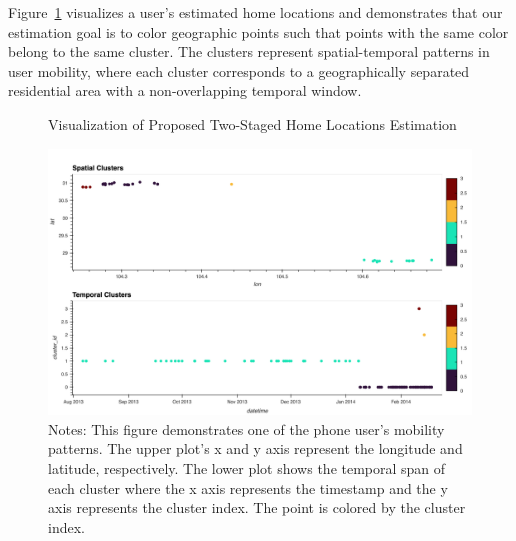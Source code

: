 \clearpage\newpage
Figure~\ref{fig:cluster} visualizes a user's estimated home locations and demonstrates that our estimation goal is to color geographic points such that points with the same color belong to the same cluster.
The clusters represent spatial-temporal patterns in user mobility, where each cluster corresponds to a geographically separated residential area with a non-overlapping temporal window.

\begin{figure}[h!]
\vspace{0.3cm}
\centering
\caption{Visualization of Proposed Two-Staged Home Locations Estimation}

\includegraphics[width=1\textwidth]{figures/cluster_res.png}

\vspace{0.1cm}
\caption*{Notes:  This figure demonstrates one of the phone user's mobility patterns. The upper plot's x and y axis represent the longitude and latitude, respectively. The lower plot shows the temporal span of each cluster where the x axis represents the timestamp and the y axis represents the cluster index. The point is colored by the cluster index.}
\label{fig:cluster}
\end{figure}

\clearpage\newpage
